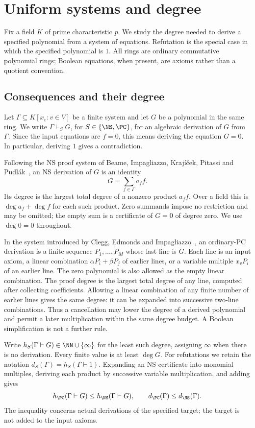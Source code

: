 \section{Uniform systems and degree}\label{sec:systems}
Fix a field $K$ of prime characteristic $p$. We study the degree needed
to derive a specified polynomial from a system of equations. Refutation
is the special case in which the specified polynomial is $1$. All rings
are ordinary commutative polynomial rings; Boolean equations, when
present, are axioms rather than a quotient convention.

\subsection{Consequences and their degree}
Let $\Gamma\subseteq K[x_v:v\in V]$ be a finite system and let $G$ be a
polynomial in the same ring. We write $\Gamma\vdash_S G$, for
$S\in\{\NS,\PC\}$, for an algebraic derivation of $G$ from $\Gamma$.
Since the input equations are $f=0$, this means deriving the equation
$G=0$. In particular, deriving $1$ gives a contradiction.

Following the NS proof system of Beame, Impagliazzo, Kraj\'i\v cek,
Pitassi and Pudl\'ak~\cite{NSFoundations}, an NS derivation of $G$ is
an identity
\[
                  G=\sum_{f\in\Gamma}a_f f.
\]
Its degree is the largest total degree of a nonzero product $a_f f$.
Over a field this is $\deg a_f+\deg f$ for each such product. Zero
summands impose no restriction and may be omitted; the empty sum is a
certificate of $G=0$ of degree zero. We use $\deg0=0$ throughout.

In the system introduced by Clegg, Edmonds and
Impagliazzo~\cite{PCFoundations}, an ordinary-PC derivation is a finite
sequence $P_1,\ldots,P_M$ whose
last line is $G$. Each line is an input axiom, a linear combination
$\alpha P_i+\beta P_j$ of earlier lines, or a variable multiple $x_vP_i$
of an earlier line. The zero polynomial is also allowed as the empty
linear combination. The proof degree is the largest total degree of any
line, computed after collecting coefficients. Allowing a linear
combination of any finite number of earlier lines gives the same
degree: it can be expanded into successive two-line combinations. Thus a cancellation may
lower the degree of a derived polynomial and permit a later
multiplication within the same degree budget. A Boolean simplification
is not a further rule.

Write $h_S(\Gamma\vdash G)\in\NN\cup\{\infty\}$ for the least such
degree, assigning $\infty$ when there is no derivation. Every finite
value is at least $\deg G$. For refutations we retain the notation
$d_S(\Gamma)=h_S(\Gamma\vdash1)$. Expanding an NS certificate into
monomial multiples, deriving each product by successive variable
multiplication, and adding gives
\begin{equation}\label{eq:pcns}
 h_{\PC}(\Gamma\vdash G)\le h_{\NS}(\Gamma\vdash G),
 \qquad d_{\PC}(\Gamma)\le d_{\NS}(\Gamma).
\end{equation}
The inequality concerns actual derivations of the specified target;
the target is not added to the input axioms.

